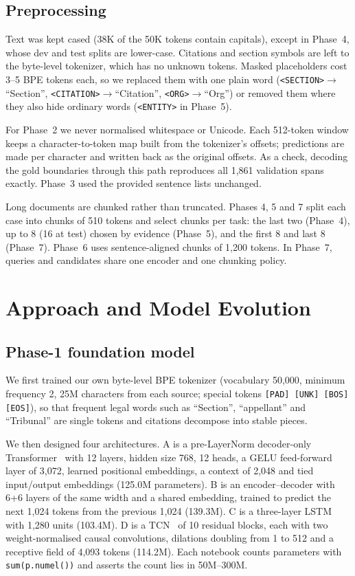 \documentclass[11pt, oneside]{article}
\newcommand{\A}{\textsf{A}}\newcommand{\B}{\textsf{B}}\newcommand{\C}{\textsf{C}}\newcommand{\D}{\textsf{D}}
\begin{document}
\subsection{Preprocessing}
Text was kept cased (38K of the 50K tokens contain capitals), except in Phase~4, whose dev and test splits are lower-case. Citations and section symbols are left to the byte-level tokenizer, which has no unknown tokens. Masked placeholders cost 3--5 BPE tokens each, so we replaced them with one plain word (\texttt{<SECTION>}$\rightarrow$``Section'', \texttt{<CITATION>}$\rightarrow$``Citation'', \texttt{<ORG>}$\rightarrow$``Org'') or removed them where they also hide ordinary words (\texttt{<ENTITY>} in Phase~5).

For Phase~2 we never normalised whitespace or Unicode. Each 512-token window keeps a character-to-token map built from the tokenizer's offsets; predictions are made per character and written back as the original offsets. As a check, decoding the gold boundaries through this path reproduces all 1,861 validation spans exactly. Phase~3 used the provided sentence lists unchanged.

Long documents are chunked rather than truncated. Phases 4, 5 and 7 split each case into chunks of 510 tokens and select chunks per task: the last two (Phase~4), up to 8 (16 at test) chosen by evidence (Phase~5), and the first 8 and last 8 (Phase~7). Phase~6 uses sentence-aligned chunks of 1,200 tokens. In Phase~7, queries and candidates share one encoder and one chunking policy.

\section{Approach and Model Evolution}\label{sec:approach}
\subsection{Phase-1 foundation model}
We first trained our own byte-level BPE tokenizer (vocabulary 50,000, minimum frequency 2, 25M characters from each source; special tokens \texttt{[PAD] [UNK] [BOS] [EOS]}), so that frequent legal words such as ``Section'', ``appellant'' and ``Tribunal'' are single tokens and citations decompose into stable pieces.

We then designed four architectures. \A{} is a pre-LayerNorm decoder-only Transformer~\cite{vaswani2017attention} with 12 layers, hidden size 768, 12 heads, a GELU feed-forward layer of 3,072, learned positional embeddings, a context of 2,048 and tied input/output embeddings (125.0M parameters). \B{} is an encoder--decoder with 6+6 layers of the same width and a shared embedding, trained to predict the next 1,024 tokens from the previous 1,024 (139.3M). \C{} is a three-layer LSTM~\cite{hochreiter1997lstm} with 1,280 units (103.4M). \D{} is a TCN~\cite{bai2018tcn} of 10 residual blocks, each with two weight-normalised causal convolutions, dilations doubling from 1 to 512 and a receptive field of 4,093 tokens (114.2M). Each notebook counts parameters with \texttt{sum(p.numel())} and asserts the count lies in 50M--300M.
\end{document}
